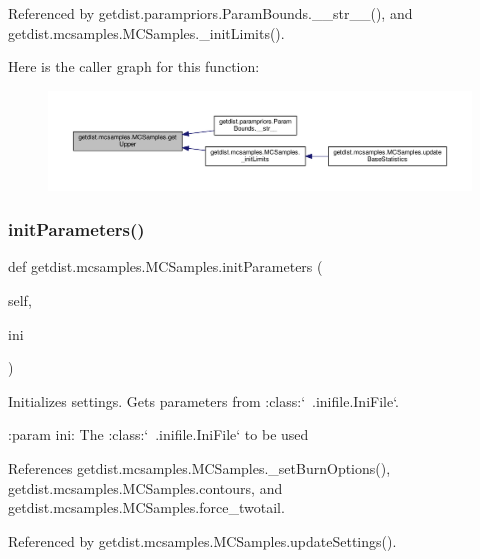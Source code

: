 Referenced by getdist.\+parampriors.\+Param\+Bounds.\+\_\+\+\_\+str\+\_\+\+\_\+(), and getdist.\+mcsamples.\+M\+C\+Samples.\+\_\+init\+Limits().

Here is the caller graph for this function\+:
\nopagebreak
\begin{figure}[H]
\begin{center}
\leavevmode
\includegraphics[width=350pt]{classgetdist_1_1mcsamples_1_1MCSamples_aa631bee569cca53afa3ea837f66e2a5b_icgraph}
\end{center}
\end{figure}
\mbox{\label{classgetdist_1_1mcsamples_1_1MCSamples_af5783ec0e78ebfceda4c0af135407236}} 
\subsubsection{\texorpdfstring{init\+Parameters()}{initParameters()}}
{\footnotesize\ttfamily def getdist.\+mcsamples.\+M\+C\+Samples.\+init\+Parameters (\begin{DoxyParamCaption}\item[{}]{self,  }\item[{}]{ini }\end{DoxyParamCaption})}

\begin{DoxyVerb}Initializes settings.
Gets parameters from :class:`~.inifile.IniFile`.

:param ini:  The :class:`~.inifile.IniFile` to be used
\end{DoxyVerb}
 

References getdist.\+mcsamples.\+M\+C\+Samples.\+\_\+set\+Burn\+Options(), getdist.\+mcsamples.\+M\+C\+Samples.\+contours, and getdist.\+mcsamples.\+M\+C\+Samples.\+force\+\_\+twotail.



Referenced by getdist.\+mcsamples.\+M\+C\+Samples.\+update\+Settings().

